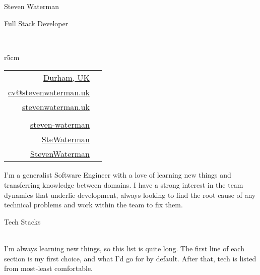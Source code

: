\documentclass[hidelinks, 12pt, a4paper]{article}
\begin{document}
	
	\begin{Huge}Steven Waterman\end{Huge}
	
	\vspace{6pt}\hspace{120pt} \begin{large}Full Stack Developer\end{large}\\
	
	\begin{wraptable}{r}{5cm}
		\vspace{-75pt}
		\begin{tabular}{rc}
			\href{https://en.wikipedia.org/wiki/Durham,_England}{Durham, UK} & \href{https://en.wikipedia.org/wiki/Durham,_England}{\faHome} \\
			\href{mailto:cv@stevenwaterman.uk}{cv@stevenwaterman.uk} & \href{mailto:cv@stevenwaterman.uk}{\faEnvelope} \\
			\href{http://www.stevenwaterman.uk}{stevenwaterman.uk} & \href{http://www.stevenwaterman.uk}{\faLink} \\
			&\\
			\href{https://www.linkedin.com/in/steven-waterman/}{steven-waterman} & \href{https://www.linkedin.com/in/steven-waterman/}{\faLinkedin} \\
			\href{https://twitter.com/SteWaterman}{SteWaterman} & \href{https://twitter.com/SteWaterman}{\faTwitter} \\
			\href{https://github.com/stevenwaterman}{StevenWaterman} & \href{https://github.com/stevenwaterman}{\faGithub}
		\end{tabular}
	\end{wraptable}
	
	I'm a generalist Software Engineer with a love of learning new things and transferring knowledge between domains.
	I have a strong interest in the team dynamics that underlie development, always looking to find the root cause of any technical problems and work within the team to fix them.
	
	\vspace{40pt}
	\begin{Large}Tech Stacks\end{Large}\\

	I'm always learning new things, so this list is quite long.
	The first line of each section is my first choice, and what I'd go for by default.
	After that, tech is listed from most-least comfortable.\\
	
\end{document}
